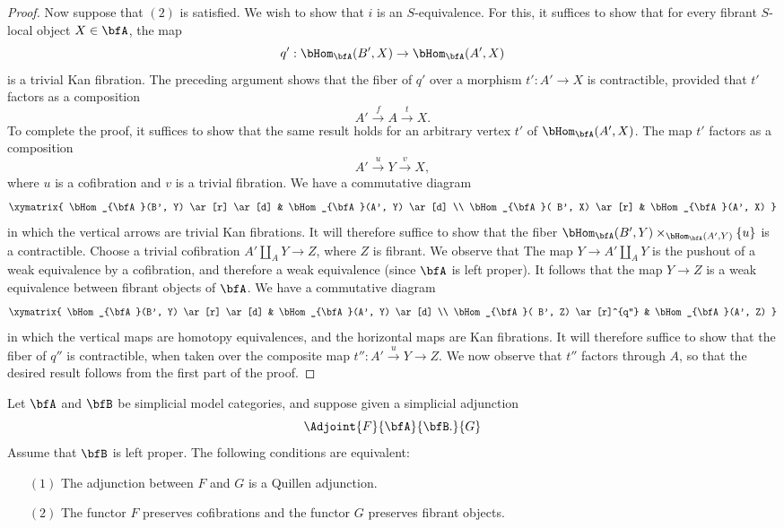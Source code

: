 \begin{proof}
Now suppose that $(2)$ is satisfied. We wish to show that $i$ is an $S$-equivalence. For this, it suffices to show that for every fibrant $S$-local object $X \in \bfA$, the map
$$ q': \bHom_{\bfA}( B', X) \rightarrow \bHom_{\bfA}(A',X)$$ is a trivial Kan fibration.
The preceding argument shows that the fiber of $q'$ over a morphism $t': A' \rightarrow X$ is contractible, provided that $t'$ factors as a composition
$$ A' \stackrel{f}{\rightarrow} A \stackrel{t}{\rightarrow} X.$$
To complete the proof, it suffices to show that the same result holds for an arbitrary vertex
$t'$ of $\bHom_{\bfA}(A', X)$. The map $t'$ factors as a composition
$$ A' \stackrel{u}{\rightarrow} Y \stackrel{v}{\rightarrow} X,$$
where $u$ is a cofibration and $v$ is a trivial fibration. We have a commutative diagram
$$ \xymatrix{ \bHom_{\bfA}(B', Y) \ar[r] \ar[d] & \bHom_{\bfA}(A', Y) \ar[d] \\
\bHom_{\bfA}( B', X) \ar[r] & \bHom_{\bfA}(A', X) }$$
in which the vertical arrows are trivial Kan fibrations. It will therefore suffice to show that the fiber 
$\bHom_{\bfA}(B', Y) \times_{ \bHom_{\bfA}(A',Y) } \{ u \}$ is a contractible.
Choose a trivial cofibration $A' \coprod_{A} Y \rightarrow Z$, where $Z$ is fibrant. We observe that
The map $Y \rightarrow A' \coprod_{A} Y$ is the pushout of a weak equivalence by a cofibration, and therefore a weak equivalence (since $\bfA$ is left proper). It follows that the map
$Y \rightarrow Z$ is a weak equivalence between fibrant objects of $\bfA$. We have a commutative diagram 
$$ \xymatrix{ \bHom_{\bfA}(B', Y) \ar[r] \ar[d] & \bHom_{\bfA}(A', Y) \ar[d] \\
\bHom_{\bfA}( B', Z) \ar[r]^{q''} & \bHom_{\bfA}(A', Z) }$$
in which the vertical maps are homotopy equivalences, and the horizontal maps are Kan fibrations. It will therefore suffice to show that the fiber of $q''$ is contractible, when taken over the composite map $t'': A' \stackrel{u}{\rightarrow} Y \rightarrow Z$. We now observe that $t''$ factors through
$A$, so that the desired result follows from the first part of the proof.
\end{proof}

\begin{corollary}\label{swask}
Let $\bfA$ and $\bfB$ be simplicial model categories, and suppose given a simplicial adjunction
$$ \Adjoint{F}{\bfA}{\bfB.}{G}$$
Assume that $\bfB$ is left proper. The following conditions are equivalent:
\begin{itemize}
\item[$(1)$] The adjunction between $F$ and $G$ is a Quillen adjunction.
\item[$(2)$] The functor $F$ preserves cofibrations and the functor $G$ preserves fibrant objects.
\end{itemize}
\end{corollary}

